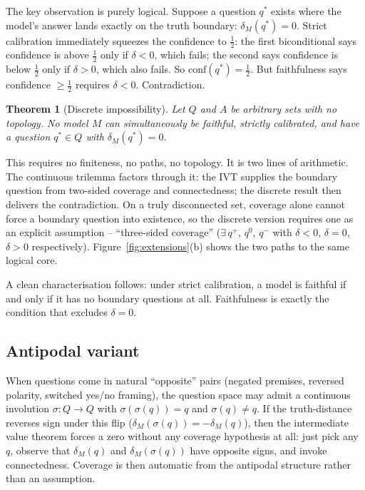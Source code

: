 \documentclass[10pt]{article}
\newtheorem{theorem}{Theorem}[section]
\newcommand{\conf}{\mathrm{conf}}
\begin{document}
The key observation is purely logical. Suppose a question $q^*$ exists
where the model's answer lands exactly on the truth boundary:
$\delta_M(q^*) = 0$. Strict calibration immediately squeezes the
confidence to $\tfrac{1}{2}$: the first biconditional says confidence is
above $\tfrac{1}{2}$ only if $\delta < 0$, which fails; the second says
confidence is below $\tfrac{1}{2}$ only if $\delta > 0$, which also fails.
So $\conf(q^*) = \tfrac{1}{2}$. But faithfulness says confidence
$\geq \tfrac{1}{2}$ requires $\delta < 0$. Contradiction.

\begin{theorem}[Discrete impossibility]
\label{thm:pure-discrete}
Let $Q$ and $A$ be arbitrary sets with no topology. No model $M$ can
simultaneously be faithful, strictly calibrated, and have a question
$q^* \in Q$ with $\delta_M(q^*) = 0$.
\end{theorem}

This requires no finiteness, no paths, no topology. It is two lines of
arithmetic. The continuous trilemma factors through it: the IVT supplies
the boundary question from two-sided coverage and connectedness; the
discrete result then delivers the contradiction. On a truly disconnected
set, coverage alone cannot force a boundary question into existence, so
the discrete version requires one as an explicit assumption --
``three-sided coverage'' ($\exists\,q^+$, $q^0$, $q^-$ with $\delta < 0$,
$\delta = 0$, $\delta > 0$ respectively). Figure~\ref{fig:extensions}(b)
shows the two paths to the same logical core.

A clean characterisation follows: under strict calibration, a model is
faithful if and only if it has no boundary questions at all. Faithfulness
is exactly the condition that excludes $\delta = 0$.

\subsection{Antipodal variant}
\label{sec:borsuk}

When questions come in natural ``opposite'' pairs (negated premises,
reversed polarity, switched yes/no framing), the question space may
admit a continuous involution $\sigma\colon Q \to Q$ with
$\sigma(\sigma(q)) = q$ and $\sigma(q) \neq q$. If the truth-distance
reverses sign under this flip ($\delta_M(\sigma(q)) = -\delta_M(q)$),
then the intermediate value theorem forces a zero without any coverage
hypothesis at all: just pick any $q$, observe that $\delta_M(q)$ and
$\delta_M(\sigma(q))$ have opposite signs, and invoke connectedness.
Coverage is then automatic from the antipodal structure rather than an
assumption.
\end{document}
